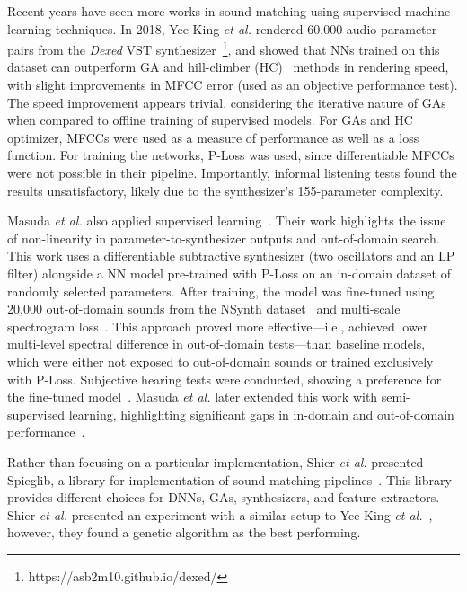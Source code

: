 Recent years have seen more works in sound-matching using supervised machine learning techniques. In 2018, Yee-King \textit{et al.} rendered 60,000 audio-parameter pairs from the \textit{Dexed} \gls{VST} synthesizer~\footnote{https://asb2m10.github.io/dexed/}, and showed that NNs trained on this dataset can outperform GA and hill-climber (\gls{HC})~\cite{hoffmann2000heuristic} methods in rendering speed, with slight improvements in MFCC error (used as an objective performance test). The speed improvement appears trivial, considering the iterative nature of GAs when compared to offline training of supervised models. For GAs and HC optimizer, MFCCs were used as a measure of performance as well as a loss function. For training the networks, P-Loss was used, since differentiable MFCCs were not possible in their pipeline. Importantly, informal listening tests found the results unsatisfactory, likely due to the synthesizer’s 155-parameter complexity. 

Masuda \textit{et al.} also applied supervised learning~\cite{masuda2021soundmatch}. Their work highlights the issue of non-linearity in parameter-to-synthesizer outputs and out-of-domain search. This work uses a differentiable subtractive synthesizer (two oscillators and an LP filter) alongside a NN model pre-trained with P-Loss on an in-domain dataset of randomly selected parameters. After training, the model was fine-tuned using 20,000 out-of-domain sounds from the NSynth dataset~\cite{engel2017neural} and multi-scale spectrogram loss~\cite{engel2020ddsp}. This approach proved more effective---i.e., achieved lower multi-level spectral difference in out-of-domain tests---than baseline models, which were either not exposed to out-of-domain sounds or trained exclusively with P-Loss. Subjective hearing tests were conducted, showing a preference for the fine-tuned model~\cite{masuda2022soundmatch}. Masuda \textit{et al.} later extended this work with semi-supervised learning, highlighting significant gaps in in-domain and out-of-domain performance~\cite{masuda2023improving}.

Rather than focusing on a particular implementation, Shier \textit{et al.} presented Spieglib, a library for implementation of sound-matching pipelines~\cite{shier2020spiegelib}. This library provides different choices for DNNs, GAs, synthesizers, and feature extractors. Shier \textit{et al.} presented an experiment with a similar setup to Yee-King \textit{et al.}~\cite{yee2018automatic}, however, they found a genetic algorithm as the best performing.

